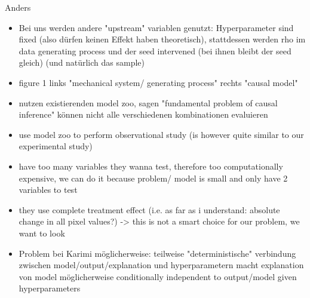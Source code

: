Anders
\begin{itemize}
      \item Bei uns werden andere "upstream" variablen genutzt: Hyperparameter sind fixed (also dürfen keinen Effekt haben theoretisch), stattdessen werden rho im data generating process und der seed intervened (bei ihnen bleibt der seed gleich) (und natürlich das sample)
      \item figure 1 links "mechanical system/ generating process" rechts "causal model"
      \item nutzen existierenden model zoo, sagen "fundamental problem of causal inference" können nicht alle verschiedenen kombinationen evaluieren
      \item use model zoo to perform observational study (is however quite similar to our experimental study)
      \item have too many variables they wanna test, therefore too computationally expensive, we can do it because problem/ model is small and only have 2 variables to test
      \item they use complete treatment effect (i.e. as far as i understand: absolute change in all pixel values?) -> this is not a smart choice for our problem, we want to look
      \item Problem bei Karimi möglicherweise: teilweise "deterministische" verbindung zwischen model/output/explanation und hyperparametern macht explanation von model möglicherweise conditionally independent to output/model given hyperparameters
\end{itemize}

